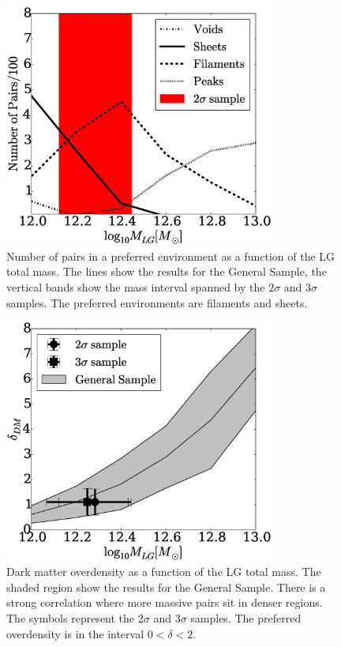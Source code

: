 \documentclass{iau}
\begin{document}
\begin{figure}[t]
\begin{center}
 \includegraphics[width=3.5in]{histogram_mass_distro.eps} 
 \caption{Number of pairs in a preferred environment as a function of
   the LG total mass. The lines show the results for the General
   Sample, the vertical bands show the mass interval spanned by the
   $2\sigma$ and $3\sigma$ samples. The preferred environments are
   filaments and sheets.}
   \label{fig:environment}
\end{center}
\end{figure}



\begin{figure}[t]
\begin{center}
 \includegraphics[width=3.5in]{median_mass_overdensity.eps} 
 \caption{Dark matter overdensity as a function of the LG total
   mass. The shaded region show the results for the General
   Sample. There is a strong correlation where more massive pairs sit
   in  denser regions. The symbols represent the $2\sigma$ and
   $3\sigma$ samples. The preferred overdensity is in the interval
   $0<\delta<2$.}
   \label{fig:overdensity}
\end{center}
\end{figure}
\end{document}
